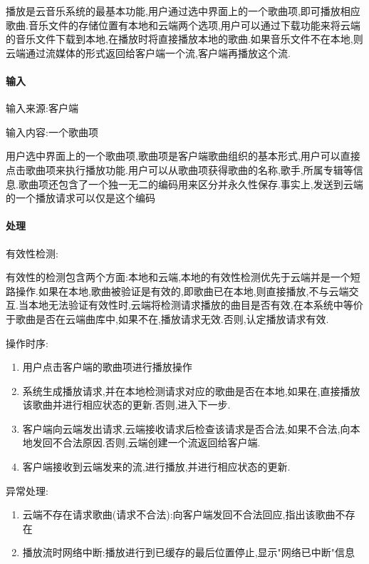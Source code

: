 播放是云音乐系统的最基本功能,用户通过选中界面上的一个歌曲项,即可播放相应歌曲.音乐文件的存储位置有本地和云端两个选项,用户可以通过下载功能来将云端的音乐文件下载到本地,在播放时将直接播放本地的歌曲.如果音乐文件不在本地,则云端通过流媒体的形式返回给客户端一个流,客户端再播放这个流.

\paragraph{输入}

输入来源:客户端

输入内容:一个歌曲项

用户选中界面上的一个歌曲项,歌曲项是客户端歌曲组织的基本形式,用户可以直接点击歌曲项来执行播放功能.用户可以从歌曲项获得歌曲的名称,歌手,所属专辑等信息.歌曲项还包含了一个独一无二的编码用来区分并永久性保存.事实上,发送到云端的一个播放请求可以仅是这个编码

\paragraph{处理}

有效性检测:

有效性的检测包含两个方面:本地和云端,本地的有效性检测优先于云端并是一个短路操作.如果在本地,歌曲被验证是有效的,即歌曲已在本地,则直接播放,不与云端交互.当本地无法验证有效性时,云端将检测请求播放的曲目是否有效,在本系统中等价于歌曲是否在云端曲库中,如果不在,播放请求无效.否则,认定播放请求有效.

操作时序:
\begin{enumerate}
	\item 用户点击客户端的歌曲项进行播放操作
	\item 系统生成播放请求,并在本地检测请求对应的歌曲是否在本地,如果在,直接播放该歌曲并进行相应状态的更新.否则,进入下一步.
	\item 客户端向云端发出请求,云端接收请求后检查该请求是否合法,如果不合法,向本地发回不合法原因.否则,云端创建一个流返回给客户端.
	\item 客户端接收到云端发来的流,进行播放,并进行相应状态的更新.
\end{enumerate}


异常处理:
\begin{enumerate}
	\item 云端不存在请求歌曲(请求不合法):向客户端发回不合法回应,指出该歌曲不存在
	\item 播放流时网络中断:播放进行到已缓存的最后位置停止,显示"网络已中断"信息
\end{enumerate}


